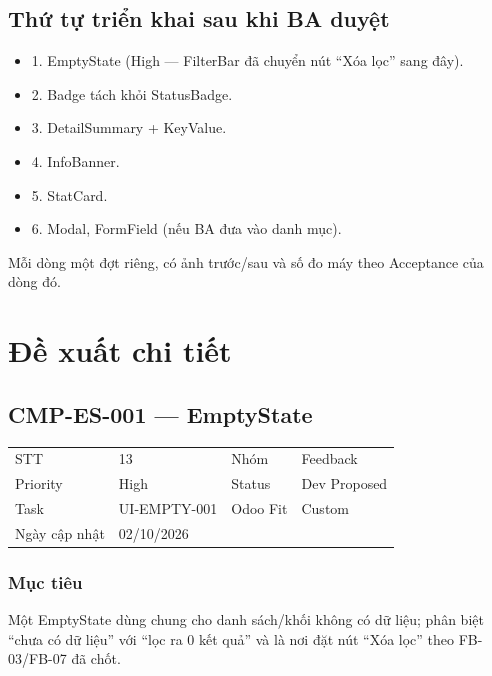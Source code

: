 \documentclass[11pt,a4paper]{report}
\begin{document}
\section*{Thứ tự triển khai sau khi BA duyệt}
\begin{itemize}[label={}]
\item 1. EmptyState (High — FilterBar đã chuyển nút “Xóa lọc” sang đây).
\item 2. Badge tách khỏi StatusBadge.
\item 3. DetailSummary + KeyValue.
\item 4. InfoBanner.
\item 5. StatCard.
\item 6. Modal, FormField (nếu BA đưa vào danh mục).
\end{itemize}
Mỗi dòng một đợt riêng, có ảnh trước/\allowbreak{}sau và số đo máy theo Acceptance của dòng đó.\par
\chapter{Đề xuất chi tiết}
\section{CMP-ES-001 --- EmptyState}
\begin{tabularx}{\textwidth}{@{}l X l X@{}}\toprule
STT & 13 & Nhóm & Feedback\\
Priority & High & Status & Dev Proposed\\
Task & UI-EMPTY-001 & Odoo Fit & Custom\\
Ngày cập nhật & 02/10/2026 & & \\\bottomrule\end{tabularx}
\subsection*{Mục tiêu}
Một EmptyState dùng chung cho danh sách/\allowbreak{}khối không có dữ liệu; phân biệt “chưa có dữ liệu” với “lọc ra 0 kết quả” và là nơi đặt nút “Xóa lọc” theo FB-03/\allowbreak{}FB-07 đã chốt.\par
\end{document}
